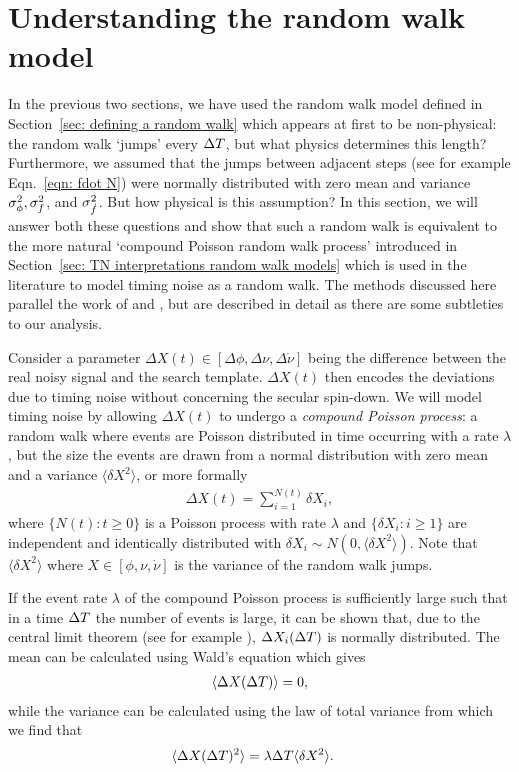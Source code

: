 \documentclass[../full_thesis/full_thesis.tex]{subfiles}
\begin{document}
\section{Understanding the random walk model}
\label{sec: understanding the random walk model}

In the previous two sections, we have used the random walk model
defined in Section~\ref{sec: defining a random walk} which appears at first to
be non-physical: the random walk `jumps' every $\Delta T$, but what
physics determines this length? Furthermore, we assumed that the jumps between
adjacent steps (see for example Eqn.~\eqref{eqn: fdot N}) were normally
distributed with zero mean and variance $\sigma_{\phi}^{2}, \sigma_{f}^{2}$, and $\sigma_{\dot{f}}^{2}$. But how
physical is this assumption?
In this section, we will answer both these questions and show that such a
random walk is equivalent to the more natural `compound Poisson random walk
process' introduced in Section~\ref{sec: TN interpretations random walk models}
which is used in the literature to model timing noise as a random walk.  The
methods discussed here parallel the work of \citet{Groth1975} and
\citet{Cordes1980}, but are described in detail as there are some subtleties to
our analysis.

Consider a parameter $\Delta X(t) \in [\Delta\phi, \Delta\nu,\Delta\dot{\nu}]$ being
the difference between the real noisy signal and the search template. $\Delta
X(t)$ then encodes the deviations due to timing noise without concerning the
secular spin-down.  We will model timing noise by allowing $\Delta X(t)$ to
undergo a \emph{compound Poisson process}: a random walk where events are
Poisson distributed in time occurring with a rate $\lambda$, but the size the
events are drawn from a normal distribution with zero mean and a variance
$\langle \delta X^{2} \rangle$, or more formally
\begin{align}
\Delta X(t) = \sum_{i=1}^{N(t)} \delta X_i,
\label{eqn: X def}
\end{align}
where $\{ N(t): t \ge 0\}$ is a Poisson process with rate $\lambda$ and
$\{\delta X_i: i \ge 1\}$ are independent and identically distributed with
$\delta X_i \sim N(0, \langle \delta X^{2}\rangle)$. Note that $\langle \delta X^{2} \rangle$
where $X \in [\phi, \nu, \dot{\nu}]$ is the variance of the random walk jumps.

If the event rate $\lambda$ of the compound Poisson process is sufficiently
large such that in a time $\Delta T$ the number of events is large, it can be shown
that, due to the central limit theorem
(see for example \citet{weiss2006course}), $\Delta X_i(\Delta T)$ is normally
distributed. The mean can be calculated using Wald's
equation \citep{wald1944cumulative} which gives
\begin{align}
\langle \Delta X(\Delta T) \rangle = 0,
\label{eqn: DX mean}
\end{align}
while the variance can be calculated using the law of total variance
\citep{weiss2006course} from which we find that
\begin{align}
\langle \Delta X(\Delta T)^{2} \rangle &  = \lambda \Delta T \langle \delta X^{2}\rangle.
\label{eqn: DX var}
\end{align}
\end{document}
